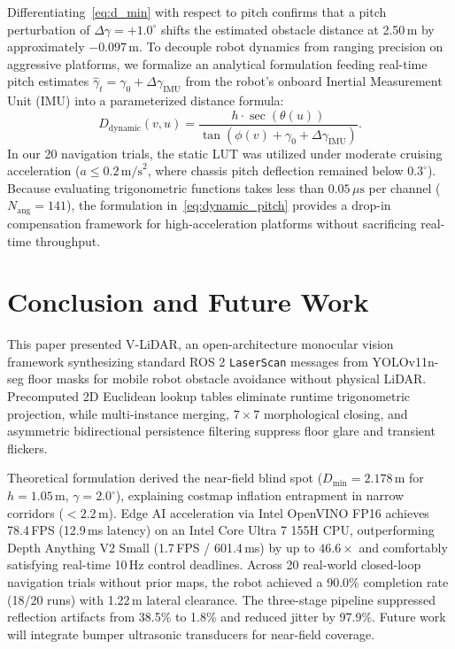 \documentclass{ieeeaccess}
\begin{document}
Differentiating~\eqref{eq:d_min} with respect to pitch confirms that a pitch perturbation of $\Delta \gamma = +1.0^\circ$ shifts the estimated obstacle distance at 2.50\,m by approximately $-0.097$\,m. To decouple robot dynamics from ranging precision on aggressive platforms, we formalize an analytical formulation feeding real-time pitch estimates $\hat{\gamma}_t = \gamma_0 + \Delta \gamma_{\mathrm{IMU}}$ from the robot's onboard Inertial Measurement Unit (IMU) into a parameterized distance formula:
\begin{equation}
  D_{\mathrm{dynamic}}(v, u) = \frac{h \cdot \sec(\theta(u))}{\tan(\phi(v) + \gamma_0 + \Delta \gamma_{\mathrm{IMU}})}.
  \label{eq:dynamic_pitch}
\end{equation}
In our 20 navigation trials, the static LUT was utilized under moderate cruising acceleration ($a \le 0.2\,\text{m/s}^2$, where chassis pitch deflection remained below $0.3^\circ$). Because evaluating trigonometric functions takes less than $0.05\,\mu\text{s}$ per channel ($N_{\mathrm{ang}}=141$), the formulation in~\eqref{eq:dynamic_pitch} provides a drop-in compensation framework for high-acceleration platforms without sacrificing real-time throughput.

\section{Conclusion and Future Work}
\label{sec:conclusion}

This paper presented V-LiDAR, an open-architecture monocular vision framework synthesizing standard ROS 2 \texttt{LaserScan} messages from YOLOv11n-seg floor masks for mobile robot obstacle avoidance without physical LiDAR. Precomputed 2D Euclidean lookup tables eliminate runtime trigonometric projection, while multi-instance merging, $7 \times 7$ morphological closing, and asymmetric bidirectional persistence filtering suppress floor glare and transient flickers.

Theoretical formulation derived the near-field blind spot ($D_{\min} = 2.178$\,m for $h=1.05$\,m, $\gamma=2.0^\circ$), explaining costmap inflation entrapment in narrow corridors ($<2.2$\,m). Edge AI acceleration via Intel OpenVINO FP16 achieves 78.4\,FPS (12.9\,ms latency) on an Intel Core Ultra 7 155H CPU, outperforming Depth Anything V2 Small (1.7\,FPS / 601.4\,ms) by up to $46.6\times$ and comfortably satisfying real-time 10\,Hz control deadlines. Across 20 real-world closed-loop navigation trials without prior maps, the robot achieved a 90.0\% completion rate (18/20 runs) with 1.22\,m lateral clearance. The three-stage pipeline suppressed reflection artifacts from 38.5\% to 1.8\% and reduced jitter by 97.9\%. Future work will integrate bumper ultrasonic transducers for near-field coverage.
\end{document}
